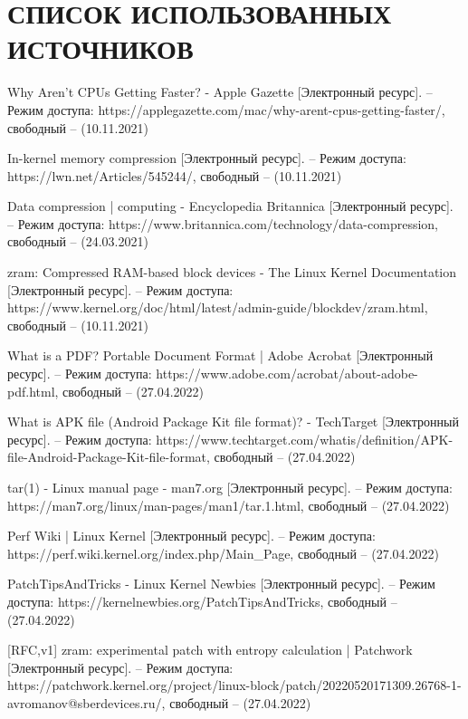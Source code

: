 \section*{СПИСОК ИСПОЛЬЗОВАННЫХ ИСТОЧНИКОВ}

\begingroup
\renewcommand{\section}[2]{}
\begin{thebibliography}{}
	
	Why Aren’t CPUs Getting Faster? - Apple Gazette [Электронный ресурс]. – Режим доступа: https://applegazette.com/mac/why-arent-cpus-getting-faster/,
 свободный – (10.11.2021)
	
	In-kernel memory compression [Электронный ресурс]. – Режим доступа: https://lwn.net/Articles/545244/, свободный – (10.11.2021)
	
	Data compression | computing - Encyclopedia Britannica [Электронный ресурс]. – Режим доступа: https://www.britannica.com/technology/data-compression, свободный – (24.03.2021)
	
	zram: Compressed RAM-based block devices - The Linux Kernel Documentation [Электронный ресурс]. – Режим доступа: https://www.kernel.org/doc/html/latest/admin-guide/blockdev/zram.html, свободный – (10.11.2021)
	
	What is a PDF? Portable Document Format | Adobe Acrobat [Электронный ресурс]. – Режим доступа: 	https://www.adobe.com/acrobat/about-adobe-pdf.html, свободный – (27.04.2022)
	
	What is APK file (Android Package Kit file format)? - TechTarget [Электронный ресурс]. – Режим доступа: 	https://www.techtarget.com/whatis/definition/APK-file-Android-Package-Kit-file-format, свободный – (27.04.2022)
	
	tar(1) - Linux manual page - man7.org [Электронный ресурс]. – Режим доступа: https://man7.org/linux/man-pages/man1/tar.1.html, свободный – (27.04.2022)
	
	Perf Wiki | Linux Kernel  [Электронный ресурс]. – Режим доступа: https://perf.wiki.kernel.org/index.php/Main\_Page, свободный – (27.04.2022)
	
	PatchTipsAndTricks - Linux Kernel Newbies  [Электронный ресурс]. – Режим доступа: https://kernelnewbies.org/PatchTipsAndTricks, свободный – (27.04.2022)
	
	[RFC,v1] zram: experimental patch with entropy calculation | Patchwork [Электронный ресурс]. – Режим доступа: 	https://patchwork.kernel.org/project/linux-block/patch/20220520171309.26768-1-avromanov@sberdevices.ru/, свободный – (27.04.2022)
\end{thebibliography}
\endgroup

\pagebreak